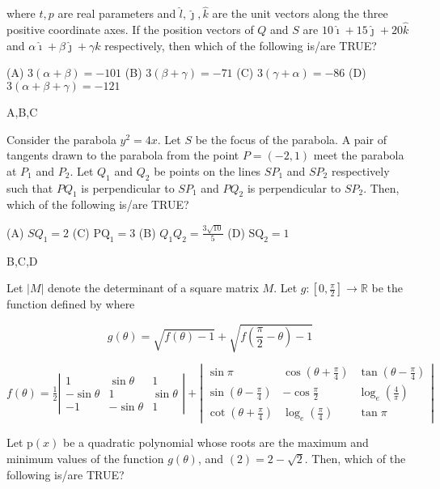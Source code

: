 where $t, p$ are real parameters and $\hat{l}, \hat{\jmath}, \hat{k}$ are the unit vectors along the three positive coordinate axes. If the position vectors of $Q$ and $S$ are $10 \hat{\imath}+15 \hat{\jmath}+20 \hat{k}$ and $\alpha \hat{\imath}+\beta \hat{\jmath}+\gamma \hat{k}$ respectively, then which of the following is/are TRUE?

(A) $3(\alpha+\beta)=-101$
(B) $3(\beta+\gamma)=-71$
(C) $3(\gamma+\alpha)=-86$
(D) $3(\alpha+\beta+\gamma)=-121$

A,B,C

Consider the parabola $y^{2}=4 x$. Let $S$ be the focus of the parabola. A pair of tangents drawn to the parabola from the point $P=(-2,1)$ meet the parabola at $P_{1}$ and $P_{2}$. Let $Q_{1}$ and $Q_{2}$ be points on the lines $S P_{1}$ and $S P_{2}$ respectively such that $P Q_{1}$ is perpendicular to $S P_{1}$ and $P Q_{2}$ is perpendicular to $S P_{2}$. Then, which of the following is/are TRUE?

(A) $S Q_{1}=2$
(C) $\mathrm{PQ}_{1}=3$
(B) $Q_{1} Q_{2}=\frac{3 \sqrt{10}}{5}$
(D) $\mathrm{SQ}_{2}=1$

B,C,D

Let $|M|$ denote the determinant of a square matrix $M$. Let $g:\left[0, \frac{\pi}{2}\right] \rightarrow \mathbb{R}$ be the function defined by where

$$
g(\theta)=\sqrt{f(\theta)-1}+\sqrt{f\left(\frac{\pi}{2}-\theta\right)-1}
$$

$f(\theta)=\frac{1}{2}\left|\begin{array}{ccc}1 & \sin \theta & 1 \\ -\sin \theta & 1 & \sin \theta \\ -1 & -\sin \theta & 1\end{array}\right|+\left|\begin{array}{ccc}\sin \pi & \cos \left(\theta+\frac{\pi}{4}\right) & \tan \left(\theta-\frac{\pi}{4}\right) \\ \sin \left(\theta-\frac{\pi}{4}\right) & -\cos \frac{\pi}{2} & \log _{e}\left(\frac{4}{\pi}\right) \\ \cot \left(\theta+\frac{\pi}{4}\right) & \log _{e}\left(\frac{\pi}{4}\right) & \tan \pi\end{array}\right|$

Let $\mathrm{p}(x)$ be a quadratic polynomial whose roots are the maximum and minimum values of the function $g(\theta)$, and $(2)=2-\sqrt{2}$. Then, which of the following is/are TRUE?

